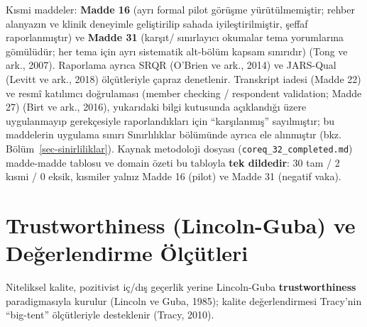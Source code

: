 \documentclass[
  turkish,
  a4paper,
  DIV=11,
  numbers=noendperiod]{scrreprt}
\begin{document}
Kısmi maddeler: \textbf{Madde 16} (ayrı formal pilot görüşme
yürütülmemiştir; rehber alanyazın ve klinik deneyimle geliştirilip
sahada iyileştirilmiştir, şeffaf raporlanmıştır) ve \textbf{Madde 31}
(karşıt/ sınırlayıcı okumalar tema yorumlarına gömülüdür; her tema için
ayrı sistematik alt-bölüm kapsam sınırıdır) (Tong ve ark., 2007).
Raporlama ayrıca SRQR (O'Brien ve ark., 2014) ve JARS-Qual (Levitt ve
ark., 2018) ölçütleriyle çapraz denetlenir. Transkript iadesi (Madde 22)
ve resmî katılımcı doğrulaması (member checking / respondent validation;
Madde 27) (Birt ve ark., 2016), yukarıdaki bilgi kutusunda açıklandığı
üzere uygulanmayıp gerekçesiyle raporlandıkları için ``karşılanmış''
sayılmıştır; bu maddelerin uygulama sınırı Sınırlılıklar bölümünde
ayrıca ele alınmıştır (bkz. Bölüm~\ref{sec-sinirliliklar}). Kaynak
metodoloji dosyası (\texttt{coreq\_32\_completed.md}) madde-madde
tablosu ve domain özeti bu tabloyla \textbf{tek dildedir}: 30 tam / 2
kısmi / 0 eksik, kısmiler yalnız Madde 16 (pilot) ve Madde 31 (negatif
vaka).

\section{Trustworthiness (Lincoln-Guba) ve Değerlendirme
Ölçütleri}\label{trustworthiness-lincoln-guba-ve-deux11ferlendirme-uxf6luxe7uxfctleri}

Niteliksel kalite, pozitivist iç/dış geçerlik yerine Lincoln-Guba
\textbf{trustworthiness} paradigmasıyla kurulur (Lincoln ve Guba, 1985);
kalite değerlendirmesi Tracy'nin ``big-tent'' ölçütleriyle desteklenir
(Tracy, 2010).
\end{document}
